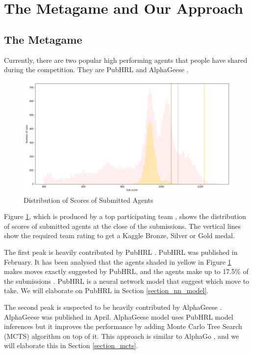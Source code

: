 \section{The Metagame and Our Approach}

\subsection{The Metagame}
\label{subsection_metagame}

Currently, there are two popular high performing agents that people have shared during the competition. They are PubHRL \cite{notebook_pubhrl} and AlphaGeese \cite{notebook_alphageese_baseline}.

\begin{figure}[h]
\centering
\includegraphics[width=\textwidth]{images/metagame.png}
\caption{Distribution of Scores of Submitted Agents}
\label{figure_metagame}
\end{figure}

Figure \ref{figure_metagame}, which is produced by a top participating team \cite{comment_agent_score_distribution}, shows the distribution of scores of submitted agents at the close of the submissions. The vertical lines show the required team rating to get a Kaggle Bronze, Silver or Gold medal.

The first peak is heavily contributed by PubHRL \cite{notebook_pubhrl}. PubHRL was published in February. It has been analysed that the agents shaded in yellow in Figure \ref{figure_metagame} makes moves exactly suggested by PubHRL, and the agents make up to 17.5\% of the submissions \cite{comment_agent_score_distribution}. PubHRL is a neural network model that suggest which move to take. We will elaborate on PubHRL in Section \ref{section_nn_model}.

The second peak is suspected to be heavily contributed by AlphaGeese \cite{notebook_alphageese_baseline}. AlphaGeese was published in April. AlphaGeese model uses PubHRL model inferences but it improves the performance by adding Monte Carlo Tree Search (MCTS) algorithm on top of it. This approach is similar to AlphaGo \cite{paper_alphago}, and we will elaborate this in Section \ref{section_mcts}.

